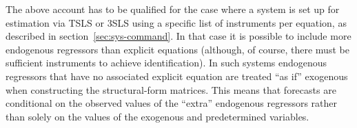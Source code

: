 The above account has to be qualified for the case where a system is
set up for estimation via TSLS or 3SLS using a specific list of
instruments per equation, as described in
section~\ref{sec:sys-command}. In that case it is possible to include
more endogenous regressors than explicit equations (although, of
course, there must be sufficient instruments to achieve
identification). In such systems endogenous regressors that have no
associated explicit equation are treated ``as if'' exogenous when
constructing the structural-form matrices. This means that forecasts
are conditional on the observed values of the ``extra'' endogenous
regressors rather than solely on the values of the exogenous and
predetermined variables. 


